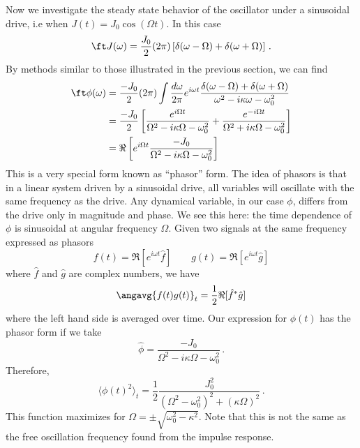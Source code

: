 
Now we investigate the steady state behavior of the oscillator under a sinusoidal drive, i.e when $J(t) = J_0 \cos(\Omega t)$.
In this case
\begin{equation}
  \ft J(\omega)=\frac{J_0}{2}(2\pi)\left[\delta(\omega-\Omega)+\delta(\omega+\Omega)\right] \, .
\end{equation}
By methods similar to those illustrated in the previous section, we can find
\begin{align}
  \ft \phi(\omega)
  & = \frac{-J_0}{2}(2\pi) \int \frac{d\omega}{2\pi} e^{i \omega t} \frac{\delta(\omega-\Omega)+\delta(\omega+\Omega)}{\omega^{2} - i\kappa \omega - \omega_0^2} \nonumber \\
  & =
    \frac{-J_0}{2}
    \left[
      \frac{e^{ i \Omega t}}{\Omega^2 - i \kappa \Omega - \omega_0^2} +
      \frac{e^{-i \Omega t}}{\Omega^2 + i \kappa \Omega - \omega_0^2}
    \right] \nonumber \\
  &= \Re \left[ e^{i \Omega t} \frac{-J_0}{\Omega^2 - i \kappa \Omega - \omega_0^2} \right]
  \label{eq:phasor_form}
\end{align}
This is a very special form known as {}``phasor'' form.
The idea of phasors is that in a linear system driven by a sinusoidal drive, all variables will oscillate with the same frequency as the drive.
Any dynamical variable, in our case $\phi$, differs from the drive only in magnitude and phase.
We see this here: the time dependence of $\phi$ is sinusoidal at angular frequency $\Omega$.
Given two signals at the same frequency expressed as phasors
\begin{equation}
  f(t) = \Re[ e^{i\omega t} \hat{f}] \qquad
  g(t) = \Re[ e^{i\omega t} \hat{g}]
\end{equation}
where $\hat{f}$ and $\hat{g}$ are complex numbers, we have
\begin{equation}
  \angavg{f(t)g(t)}_t = \frac{1}{2}\Re[\hat{f}^{*}\hat{g}]
\end{equation}
where the left hand side is averaged over time.
Our expression for $\phi(t)$ has the phasor form if we take
\begin{equation}
  \hat{\phi} = \frac{-J_0}{\Omega^{2} - i \kappa \Omega - \omega_0^2} \, .
\end{equation}
Therefore,
\begin{equation}
  \langle\phi(t)^{2}\rangle_{t}
  = \frac{1}{2} \frac{J_0^2}{(\Omega^2 - \omega_0^2)^2 + (\kappa \Omega)^2}
  \, .
\end{equation}
This function maximizes for $\Omega = \pm \sqrt{\omega_0^2 - \kappa^2}$.
Note that this is not the same as the free oscillation frequency found from the impulse response.

